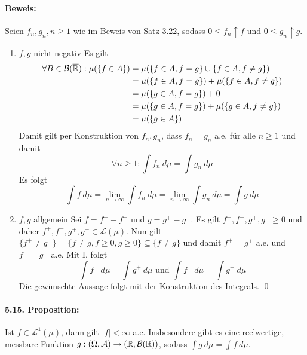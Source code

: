   \paragraph{Beweis:}
  Seien $f_n,g_n,n\geq1$ wie im Beweis von Satz 3.22, sodass $0\leq f_n\uparrow f$ und $0\leq g_n\uparrow g$.
  \begin{enumerate}[label=\Roman*.]
      \item $f,g$ nicht-negativ\newline
      Es gilt 
      \begin{align*}
          \forall B\in\mathcal{B}(\overline{\mathbb{R}}):\mu(\{f\in A\})&=\mu(\{f\in A,f=g\}\cup\{f\in A,f\neq g\})\\
          &=\mu(\{f\in A,f=g\})+\mu(\{f\in A,f\neq g\})\\
          &=\mu(\{g\in A,f=g\})+0\\
          &=\mu(\{g\in A,f=g\})+\mu(\{g\in A,f\neq g\})\\
          &=\mu(\{g\in A\})
      \end{align*}
      Damit gilt per Konstruktion von $f_n,g_n$, dass $f_n=g_n$ a.e. f\"ur alle $n\geq1$ und damit 
      $$\forall n\geq1:\displaystyle\int f_n\ d\mu=\int g_n\ d\mu$$
      Es folgt 
      $$\int f\ d\mu=\lim_{n\to\infty}\int f_n\ d\mu=\lim_{n\to\infty}\int g_n\ d\mu=\int g\ d\mu$$
      \item $f,g$ allgemein\newline
      Sei $f=f^+-f^-$ und $g=g^+-g^-$. Es gilt $f^+,f^-,g^+,g^-\geq0$ und daher $f^+,f^-,g^+,g^-\in\mathcal{L}(\mu)$. Nun gilt $\{f^+\neq g^+\}=\{f\neq g,f\geq0,g\geq0\}\subseteq\{f\neq g\}$ und damit $f^+=g^+$ a.e. und $f^-=g^-$ a.e. Mit I. folgt
      $$\int f^+\ d\mu=\int g^+\ d\mu\text{ und }\int f^-\ d\mu=\int g^-\ d\mu$$
      Die gew\"unschte Aussage folgt mit der Konstruktion des Integrals. \qed
  \end{enumerate}
  
  \paragraph{5.15. Proposition:}Ist $f\in\mathcal{L}^1(\mu)$, dann gilt $|f|<\infty$ a.e. Insbesondere gibt es eine reelwertige, messbare Funktion $g:(\Omega,\mathcal{A})\to(\mathbb{R},\mathcal{B}(\mathbb{R}))$, sodass $\int g\ d\mu=\int f\ d\mu$.
  
